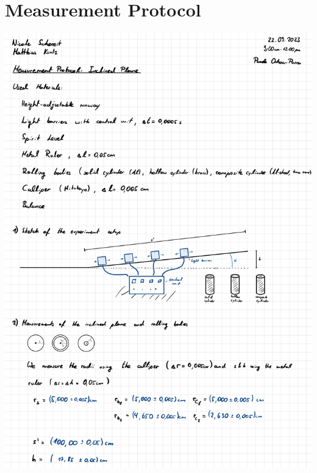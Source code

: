\documentclass{article}
\begin{document}
\newpage

\section{Measurement Protocol}

\includegraphics[width=\textwidth]{graphics/mess1.jpg}
\newpage
\end{document}
